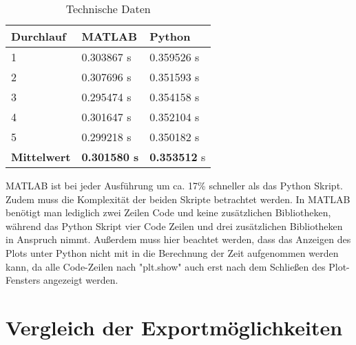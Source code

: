 \begin{table}
	\centering
	\caption{Technische Daten}
	\begin{tabular}{|l|l|l|}
		\multicolumn{1}{l}{\textbf{Durchlauf}} & \multicolumn{1}{l}{\textbf{MATLAB}} & \multicolumn{1}{l}{\textbf{Python}}  \\ 
		\hline
		1                                      & 0.303867 s                          & 0.359526
		s                           \\ 
		\hline
		2                                      & 0.307696
		s                          & 0.351593
		s                           \\ 
		\hline
		3                                      & 0.295474
		s                          & 0.354158
		s                           \\ 
		\hline
		4                                      & 0.301647 s                          & 0.352104 s                           \\ 
		\hline
		5                                      & 0.299218 s                          & 0.350182 s                           \\ 
		\hline
		\textbf{Mittelwert}                    & \textbf{0.301580 s}                          & \textbf{0.353512} s                           \\
		\hline
	\end{tabular}
\end{table}

MATLAB ist bei jeder Ausführung um ca. 17\% schneller als das Python Skript. Zudem muss die Komplexität der beiden Skripte betrachtet werden. In MATLAB benötigt man lediglich zwei Zeilen Code und keine zusätzlichen Bibliotheken, während das Python Skript  vier Code Zeilen und drei zusätzlichen Bibliotheken in Anspruch nimmt. Außerdem muss hier beachtet werden, dass das Anzeigen des Plots unter Python nicht mit in die Berechnung der Zeit aufgenommen werden kann, da alle Code-Zeilen nach "plt.show" auch erst nach dem Schließen des Plot-Fensters angezeigt werden.


\section{Vergleich der Exportmöglichkeiten}